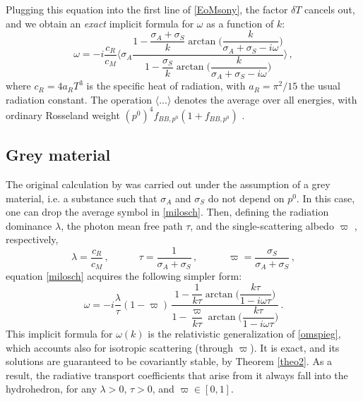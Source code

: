 \documentclass[a4paper, amsfonts, amssymb, amsmath, reprint, showkeys, nofootinbib, twoside,notitlepage,onecolumn]{revtex4-2}
\newcommand{\spc}{\quad \quad \quad}
\theoremstyle{definition}
\theoremstyle{theorem}
\theoremstyle{corollary}
\begin{document}
Plugging this equation into the first line of \eqref{EoMsony}, the factor $\delta T$ cancels out, and we obtain an \textit{exact} implicit formula for $\omega$ as a function of $k$:
\begin{equation}\label{milosch}
\omega=-i \dfrac{c_R}{c_M} \bigg\langle \sigma_A \dfrac{1-\dfrac{\sigma_A{+}\sigma_S}{k}\arctan\bigg(\dfrac{k}{\sigma_A{+}\sigma_S{-}i\omega}\bigg)}{1-\dfrac{\sigma_S}{k}\arctan\bigg(\dfrac{k}{\sigma_A{+}\sigma_S{-}i\omega}\bigg)} \bigg\rangle \, ,
\end{equation}
where $c_R=4a_RT^3$ is the specific heat of radiation, with $a_R=\pi^2/15$ the usual radiation constant. The operation $\langle ... \rangle$ denotes the average over all energies, with ordinary Rosseland weight $(p^0)^4 f_{BB,p^0}(1{+}f_{BB,p^0})$ \cite[\S 6.7]{CastorRadiationBook_2004}.

\subsection{Grey material}

The original calculation by \citet{Spiegel1957} was carried out under the assumption of a grey material, i.e. a substance such that $\sigma_A$ and $\sigma_S$ do not depend on $p^0$. In this case, one can drop the average symbol in \eqref{milosch}. Then, defining the radiation dominance $\lambda$, the photon mean free path $\tau$, and the single-scattering albedo $\varpi$ \cite[\S 5.2]{CastorRadiationBook_2004}, respectively,
\begin{equation}
\lambda =\dfrac{c_R}{c_M} \, , \spc \tau =\dfrac{1}{\sigma_A {+}\sigma_S} \, , \spc \varpi =\dfrac{\sigma_S}{\sigma_A {+}\sigma_S} \, ,
\end{equation}
equation \eqref{milosch} acquires the following simpler form:
\begin{equation}\label{roku}
\omega=-i \dfrac{\lambda}{\tau}  (1{-}\varpi) \, \dfrac{1-\dfrac{1}{k\tau}\arctan\bigg(\dfrac{k\tau}{1{-}i\omega \tau}\bigg)}{1-\dfrac{\varpi}{k\tau}\arctan\bigg(\dfrac{k\tau}{1{-}i\omega\tau}\bigg)}  \, .
\end{equation}
This implicit formula for $\omega(k)$ is the relativistic generalization of \eqref{omspieg}, which accounts also for isotropic scattering (through $\varpi$). It is exact, and its solutions are guaranteed to be covariantly stable, by Theorem \ref{theo2}. As a result, the radiative transport coefficients that arise from it always fall into the hydrohedron, for any $\lambda>0$, $\tau>0$, and $\varpi \in [0,1]$.
\end{document}
